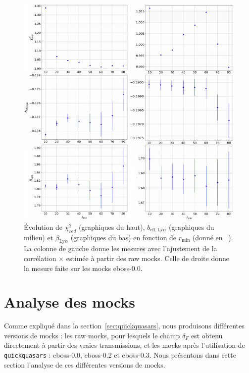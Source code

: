 \begin{figure}
  \centering
  \includegraphics[scale=0.6]{chi2_vs_rmin}
  \caption{Évolution de $\chi_{red}^2$ (graphiques du haut), $b_{\mathrm{eff},\mathrm{Ly}\alpha}$ (graphiques du milieu) et $\beta_{\mathrm{Ly}\alpha}$ (graphiques du bas) en fonction de $r_{\mathrm{min}}$ (donné en \si{\perh\Mpc}). La colonne de gauche donne les mesures avec l'ajustement de la corrélation \lya{}$\times$\lya{} estimée à partir des raw mocks. Celle de droite donne la mesure faite sur les mocks eboss-0.0.}
  \label{fig:chi2_vs_rmin}
\end{figure}

\newpage
\section{Analyse des mocks}
\label{sec:mock_ana}
Comme expliqué dans la section~\ref{sec:quickquasars}, nous produisons différentes versions de mocks : les raw mocks, pour lesquels le champ $\delta_F$ est obtenu directement à partir des vraies transmissions, et les mocks après l'utilisation de \texttt{quickquasars} : eboss-0.0, eboss-0.2 et eboss-0.3.
Nous présentons dans cette section l'analyse de ces différentes versions de mocks.


